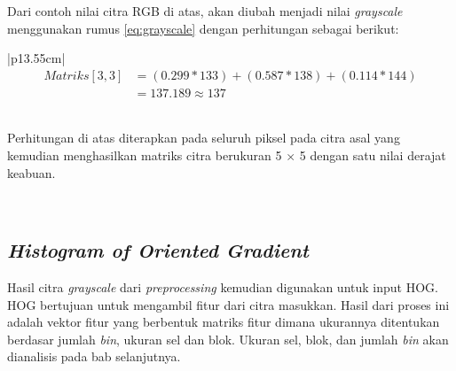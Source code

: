 Dari contoh nilai citra RGB di atas, akan diubah menjadi nilai \textit{grayscale} menggunakan rumus \eqref{eq:grayscale} dengan perhitungan sebagai berikut:

\begin{table}[H]
	\begin{adjustbox}{width=1\textwidth}
		\begin{tabular}{|p{13.55cm}|}
			\hline
			\begin{equation}\nonumber
			\begin{aligned}
			Matriks[3,3] &= (0.299 * 133) + (0.587 * 138) + (0.114 * 144) \\
						 &= 137.189 \approx 137 
			\end{aligned}
			\end{equation}\\
			\hline
		\end{tabular}
	\end{adjustbox}
\end{table}

Perhitungan di atas diterapkan pada seluruh piksel pada citra asal yang kemudian menghasilkan matriks citra berukuran 5 $\times$ 5 dengan satu nilai derajat keabuan.

\begin{adjustbox}{width=1\textwidth}
	\noindent\begin{minipage}{\linewidth}
		\label{fig:MatriksCitraGrayscale}
	\end{minipage}
\end{adjustbox} \\

\subsection{\textit{Histogram of Oriented Gradient}}
Hasil citra \textit{grayscale} dari \textit{preprocessing} kemudian digunakan untuk input HOG. HOG bertujuan untuk mengambil fitur dari citra masukkan. Hasil dari proses ini adalah vektor fitur yang berbentuk matriks fitur dimana ukurannya ditentukan berdasar jumlah \textit{bin}, ukuran sel dan blok. Ukuran sel, blok, dan jumlah \textit{bin} akan dianalisis pada bab selanjutnya.

